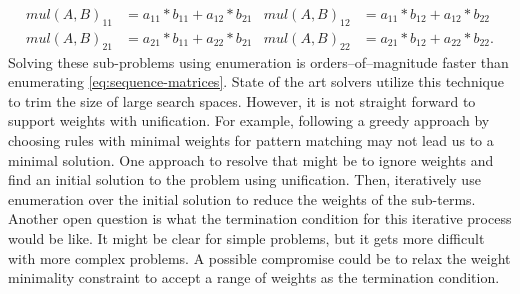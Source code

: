 \begin{description}
%
\begin{align*}
    mul(A,B)_{11} &= a_{11} * b_{11} + a_{12} * b_{21} &
    mul(A,B)_{12} &= a_{11} * b_{12} + a_{12} * b_{22} \\
    mul(A,B)_{21} &= a_{21} * b_{11} + a_{22} * b_{21} &
    mul(A,B)_{22} &= a_{21} * b_{12} + a_{22} * b_{22}. 
\end{align*}
%
Solving these sub-problems using enumeration is orders--of--magnitude faster than enumerating \eqref{eq:sequence-matrices}.
%
State of the art solvers utilize this technique to trim the size of large search spaces.
%
However, it is not straight forward to support weights with unification.
%
For example, following a greedy approach by choosing rules with minimal weights for pattern matching may not lead us to a minimal solution.
%
One approach to resolve that might be to ignore weights and find an initial solution to the problem using unification.
%
Then, iteratively use enumeration over the initial solution to reduce the weights of the sub-terms.
%
Another open question is what the termination condition for this iterative process would be like.
%
It might be clear for simple problems, but it gets more difficult with more complex problems.
%
%
A possible compromise could be to relax the weight minimality constraint to accept a range of weights as the termination condition.
%
\end{description}